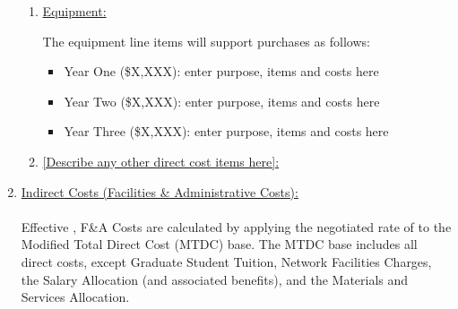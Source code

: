\begin{enumerate}
\begin{enumerate}
\item \underline{Equipment:}

The equipment line items will support purchases as follows:

\begin{itemize}

\item Year One (\$X,XXX): enter purpose, items and costs here

\item Year Two (\$X,XXX): enter purpose, items and costs here

\item Year Three (\$X,XXX): enter purpose, items and costs here

\end{itemize}

\item \underline{[Describe any other direct cost items here]:}

\end{enumerate}

\item \underline{Indirect Costs (Facilities \& Administrative Costs):}\\{~}\\
Effective \facostinception, F\&A Costs are calculated by applying the
negotiated rate of \facostrate to the Modified Total Direct Cost (MTDC)
base. The MTDC base includes all direct costs, except Graduate Student
Tuition, Network Facilities Charges, the Salary Allocation (and
associated benefits), and the Materials and Services Allocation.

\end{enumerate}
